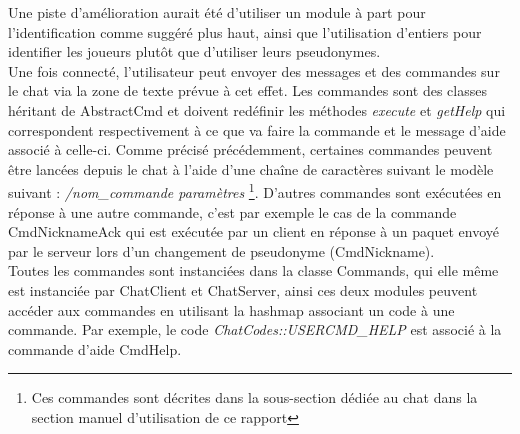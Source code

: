 Une piste d'amélioration aurait été d'utiliser un module à part pour l'identification comme suggéré plus haut, ainsi que l'utilisation d'entiers pour identifier les joueurs plutôt que d'utiliser leurs pseudonymes.\\

Une fois connecté, l'utilisateur peut envoyer des messages et des commandes sur le chat via la zone de texte prévue à cet effet. Les commandes sont des classes héritant de AbstractCmd et doivent redéfinir les méthodes \emph{execute} et \emph{getHelp} qui correspondent respectivement à ce que va faire la commande et le message d'aide associé à celle-ci. Comme précisé précédemment, certaines commandes peuvent être lancées depuis le chat à l'aide d'une chaîne de caractères suivant le modèle suivant : \emph{/nom\_commande paramètres} \footnote{Ces commandes sont décrites dans la sous-section dédiée au chat dans la section manuel d'utilisation de ce rapport}. D'autres commandes sont exécutées en réponse à une autre commande, c'est par exemple le cas de la commande CmdNicknameAck qui est exécutée par un client en réponse à un paquet envoyé par le serveur lors d'un changement de pseudonyme (CmdNickname).\\

Toutes les commandes sont instanciées dans la classe Commands, qui elle même est instanciée par ChatClient et ChatServer, ainsi ces deux modules peuvent accéder aux commandes en utilisant la hashmap associant un code à une commande. Par exemple, le code \emph{ChatCodes::USERCMD\_HELP} est associé à la commande d'aide CmdHelp.\\